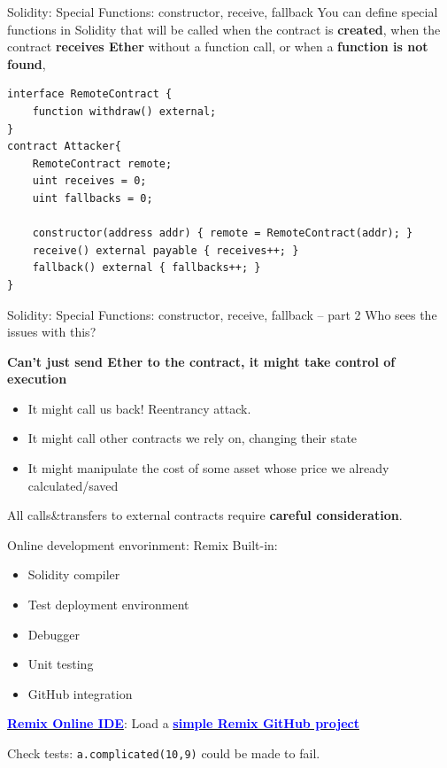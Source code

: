 \documentclass[aspectratio=169]{beamer}
\newcommand{\bluelink}[2]{\href{#1}{\textcolor{blue}{\textbf{#2}}}}
\begin{document}
\begin{frame}[fragile=singleslide]{Solidity: Special Functions: constructor, receive, fallback}
You can define special functions in Solidity that will be called when
the contract is \textbf{created},
when the contract \textbf{receives Ether} without a function call,
or when a \textbf{function is not found},

\begin{Verbatim}[frame=single, framerule=0.2mm, framesep=2mm,fontsize=\small]
interface RemoteContract {
    function withdraw() external;
}
contract Attacker{
    RemoteContract remote;
    uint receives = 0;
    uint fallbacks = 0;

    constructor(address addr) { remote = RemoteContract(addr); }
    receive() external payable { receives++; }
    fallback() external { fallbacks++; }
}
\end{Verbatim}
\end{frame}


\begin{frame}{Solidity: Special Functions: constructor, receive, fallback -- part 2}
Who sees the issues with this?
\pause
\bigskip

\textbf{Can't just send Ether to the contract, it might take control of execution}
\begin{itemize}
    \item It might call us back! Reentrancy attack.
    \item It might call other contracts we rely on, changing their state
    \item It might manipulate the cost of some asset whose price we already calculated/saved
\end{itemize}
\bigskip

All calls\&transfers to external contracts require \textbf{careful consideration}.
\end{frame}

\begin{frame}{Online development envorinment: Remix}
Built-in:
\begin{itemize}
    \item Solidity compiler
    \item Test deployment environment
    \item Debugger
    \item Unit testing
    \item GitHub integration
\end{itemize}
\bigskip

\bluelink{https://remix.ethereum.org/}{Remix Online IDE}:
Load a \bluelink{https://github.com/msooseth/remix-example}{simple Remix GitHub project}

Check tests: \texttt{a.complicated(10,9)} could be made to fail.

\end{frame}
\end{document}
